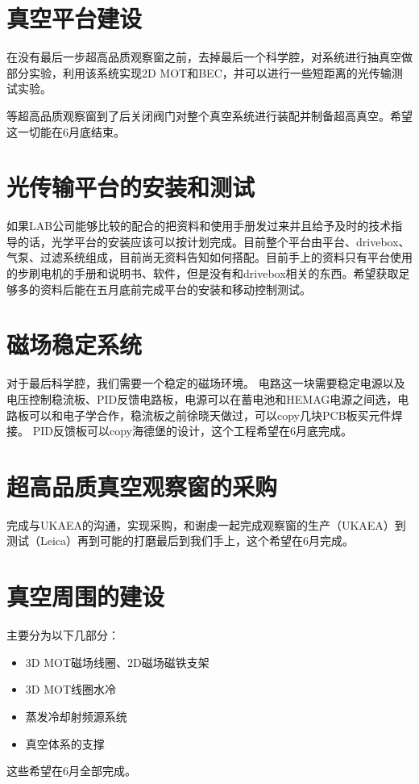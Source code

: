 \documentclass[onecolumn,a4paper,10pt]{article}
\begin{document}
\section{真空平台建设}

在没有最后一步超高品质观察窗之前，去掉最后一个科学腔，对系统进行抽真空做部分实验，利用该系统实现2D MOT和BEC，并可以进行一些短距离的光传输测试实验。

等超高品质观察窗到了后关闭阀门对整个真空系统进行装配并制备超高真空。希望这一切能在6月底结束。

\section{光传输平台的安装和测试}

如果LAB公司能够比较的配合的把资料和使用手册发过来并且给予及时的技术指导的话，光学平台的安装应该可以按计划完成。目前整个平台由平台、drivebox、气泵、过滤系统组成，目前尚无资料告知如何搭配。目前手上的资料只有平台使用的步刷电机的手册和说明书、软件，但是没有和drivebox相关的东西。希望获取足够多的资料后能在五月底前完成平台的安装和移动控制测试。

\section{磁场稳定系统}
对于最后科学腔，我们需要一个稳定的磁场环境。
电路这一块需要稳定电源以及电压控制稳流板、PID反馈电路板，电源可以在蓄电池和HEMAG电源之间选，电路板可以和电子学合作，稳流板之前徐晓天做过，可以copy几块PCB板买元件焊接。
PID反馈板可以copy海德堡的设计，这个工程希望在6月底完成。

\section{超高品质真空观察窗的采购}

完成与UKAEA的沟通，实现采购，和谢虔一起完成观察窗的生产（UKAEA）到测试（Leica）再到可能的打磨最后到我们手上，这个希望在6月完成。


\section{真空周围的建设}

主要分为以下几部分：

\begin{itemize}
\item 3D MOT磁场线圈、2D磁场磁铁支架
\item 3D MOT线圈水冷
\item 蒸发冷却射频源系统
\item 真空体系的支撑
\end{itemize}

这些希望在6月全部完成。
\end{document}
